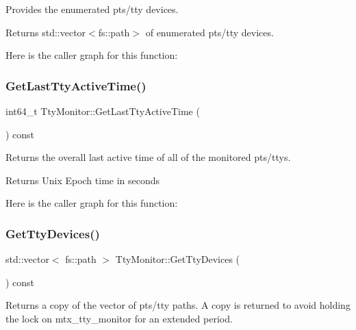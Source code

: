 Provides the enumerated pts/tty devices. 

\begin{DoxyReturn}{Returns}
std\+::vector$<$fs\+::path$>$ of enumerated pts/tty devices. 
\end{DoxyReturn}
Here is the caller graph for this function\+:
\mbox{\label{classEventDetect_1_1TtyMonitor_aae27c11393b72229dc03cc4b29f15b80}} 
\subsubsection{\texorpdfstring{Get\+Last\+Tty\+Active\+Time()}{GetLastTtyActiveTime()}}
{\footnotesize\ttfamily int64\+\_\+t Tty\+Monitor\+::\+Get\+Last\+Tty\+Active\+Time (\begin{DoxyParamCaption}{ }\end{DoxyParamCaption}) const}



Returns the overall last active time of all of the monitored pts/ttys. 

\begin{DoxyReturn}{Returns}
Unix Epoch time in seconds 
\end{DoxyReturn}
Here is the caller graph for this function\+:
\mbox{\label{classEventDetect_1_1TtyMonitor_aad86d815a645f6afd9168852d85ccf3c}} 
\subsubsection{\texorpdfstring{Get\+Tty\+Devices()}{GetTtyDevices()}}
{\footnotesize\ttfamily std\+::vector$<$ fs\+::path $>$ Tty\+Monitor\+::\+Get\+Tty\+Devices (\begin{DoxyParamCaption}{ }\end{DoxyParamCaption}) const}



Returns a copy of the vector of pts/tty paths. A copy is returned to avoid holding the lock on mtx\+\_\+tty\+\_\+monitor for an extended period. 

